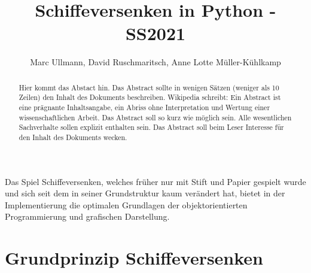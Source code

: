 \documentclass{llncs}
\begin{document}
%
%
%
\mainmatter              %
%
\title{Schiffeversenken in Python - SS2021}
%
\author{Marc Ullmann, David Ruschmaritsch, Anne Lotte Müller-Kühlkamp}
%

\maketitle              %

\begin{abstract}
Hier kommt das Abstact hin. Das Abstract sollte in wenigen Sätzen (weniger als 10 Zeilen) den Inhalt des Dokuments beschreiben. Wikipedia schreibt: Ein Abstract ist eine prägnante Inhaltsangabe, ein Abriss ohne Interpretation und Wertung einer wissenschaftlichen Arbeit. Das Abstract soll so kurz wie möglich sein. Alle wesentlichen Sachverhalte sollen explizit enthalten sein. Das Abstract soll beim Leser Interesse für den Inhalt des Dokuments wecken.
\end{abstract}

Das Spiel Schiffeversenken, welches früher nur mit Stift und Papier gespielt wurde und sich seit dem in seiner Grundstruktur kaum verändert hat, bietet in der Implementierung die optimalen Grundlagen der objektorientierten Programmierung und
grafischen Darstellung.

\section{Grundprinzip Schiffeversenken}
\end{document}
